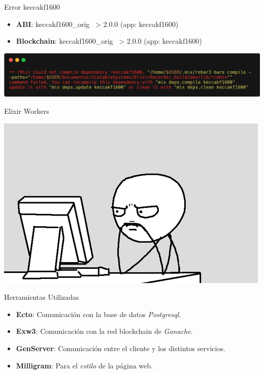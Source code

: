 \documentclass{beamer}
\begin{document}


\begin{frame}{Error keccakf1600}
  \begin{itemize}
    \item \textbf{ABI}: keccakf1600\_orig ~> 2.0.0 (app: keccakf1600)
    \item \textbf{Blockchain}: keccakf1600\_orig ~> 2.0.0 (app: keccakf1600)
  \end{itemize}
  \begin{center}
  \includegraphics[scale=0.20]{Images/error.png}
  \end{center}
\end{frame}

\begin{frame}{Elixir Workers}
  \begin{center}
  \includegraphics[scale=0.5]{Images/worker.png}
  \end{center}
\end{frame}


\begin{frame}{Herramientas Utilizadas}
  \begin{itemize}
    \item \textbf{Ecto}: Comunicación con la base de datos \textit{Postgresql}.
    \item \textbf{Exw3}: Comunicación con la red blockchain de \textit{Ganache}.
    \item \textbf{GenServer}: Comunicación entre el cliente y los distintos servicios.
    \item \textbf{Milligram}: Para el \textit{estilo} de la página web.
  \end{itemize}
\end{frame}
\end{document}
